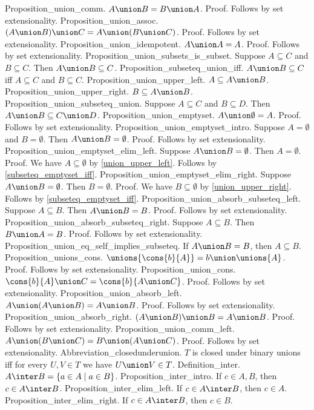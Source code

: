 Proposition_union_comm. $A \union B = B \union A$.
Proof. Follows by set extensionality.
Proposition_union_assoc. $(A \union B) \union C = A \union (B \union C)$.
Proof. Follows by set extensionality.
Proposition_union_idempotent. $A \union A = A$.
Proof. Follows by set extensionality.
Proposition_union_subsets_is_subset. Suppose $A \subseteq C$ and $B \subseteq C$. Then $A \union B \subseteq C$.
Proposition_subseteq_union_iff. $A \union B \subseteq C$ iff $A \subseteq C$ and $B \subseteq C$.
Proposition_union_upper_left. $A \subseteq A \union B$.
Proposition_union_upper_right. $B \subseteq A \union B$.
Proposition_union_subseteq_union. Suppose $A \subseteq C$ and $B \subseteq D$. Then $A \union B \subseteq C \union D$.
Proposition_union_emptyset. $A \union \emptyset = A$.
Proof. Follows by set extensionality.
Proposition_union_emptyset_intro. Suppose $A =  \emptyset$ and $B =  \emptyset$. Then $A \union B =  \emptyset$.
Proof. Follows by set extensionality.
Proposition_union_emptyset_elim_left. Suppose $A \union B =  \emptyset$. Then $A =  \emptyset$.
Proof. We have $A \subseteq \emptyset$ by  \cref{union_upper_left}. Follows by  \cref{subseteq_emptyset_iff}.
Proposition_union_emptyset_elim_right. Suppose $A \union B =  \emptyset$. Then $B =  \emptyset$.
Proof. We have $B \subseteq \emptyset$ by  \cref{union_upper_right}. Follows by  \cref{subseteq_emptyset_iff}.
Proposition_union_absorb_subseteq_left. Suppose $A \subseteq B$. Then $A \union B = B$.
Proof. Follows by set extensionality.
Proposition_union_absorb_subseteq_right. Suppose $A \subseteq B$. Then $B \union A = B$.
Proof. Follows by set extensionality.
Proposition_union_eq_self_implies_subseteq. If $A \union B = B$, then $A \subseteq B$.
Proposition_unions_cons. $ \unions{ \cons{b}{A}} = b \union \unions{A}$.
Proof. Follows by set extensionality.
Proposition_union_cons. $ \cons{b}{A}  \union C =  \cons{b}{A \union C}$.
Proof. Follows by set extensionality.
Proposition_union_absorb_left. $A \union (A \union B) = A \union B$.
Proof. Follows by set extensionality.
Proposition_union_absorb_right. $(A \union B) \union B = A \union B$.
Proof. Follows by set extensionality.
Proposition_union_comm_left. $A \union (B \union C) = B \union (A \union C)$.
Proof. Follows by set extensionality.
Abbreviation_closedunderunion. $T$ is closed under binary unions iff for every $U,V \in T$ we have $U \union V \in T$.
Definition_inter. $A \inter B =  \{ a  \in A  \mid a \in B \}$.
Proposition_inter_intro. If $c \in A, B$, then $c \in A \inter B$.
Proposition_inter_elim_left. If $c \in A \inter B$, then $c \in A$.
Proposition_inter_elim_right. If $c \in A \inter B$, then $c \in B$.
